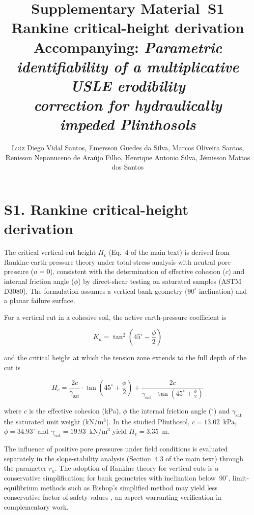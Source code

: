 \documentclass[12pt,a4paper]{article}
\title{\textbf{Supplementary Material~S1}\\[6pt]
Rankine critical-height derivation\\[6pt]
\large Accompanying: \textit{Parametric identifiability of a multiplicative USLE erodibility\\correction for hydraulically impeded Plinthosols}}
\author{Luiz Diego Vidal Santos, Emersson Guedes da Silva, Marcos Oliveira Santos,\\
Renisson Neponuceno de Ara\'{u}jo Filho, Henrique Antonio Silva, J\'{e}misson Mattos dos Santos}
\date{}
\begin{document}
\maketitle

\section*{S1. Rankine critical-height derivation}

The critical vertical-cut height $H_c$ (Eq.~4 of the main text) is derived from Rankine earth-pressure theory under total-stress analysis with neutral pore pressure ($u = 0$), consistent with the determination of effective cohesion ($c$) and internal friction angle ($\phi$) by direct-shear testing on saturated samples (ASTM D3080). The formulation assumes a vertical bank geometry ($90^\circ$ inclination) and a planar failure surface.

For a vertical cut in a cohesive soil, the active earth-pressure coefficient is

\begin{equation}
K_a = \tan^2\!\left(45^\circ - \frac{\phi}{2}\right)
\end{equation}

\noindent and the critical height at which the tension zone extends to the full depth of the cut is

\begin{equation}
H_c = \frac{2c}{\gamma_{\mathrm{sat}}} \cdot \tan\!\left(45^\circ + \frac{\phi}{2}\right) + \frac{2c}{\gamma_{\mathrm{sat}} \cdot \tan\!\left(45^\circ + \frac{\phi}{2}\right)}
\end{equation}

\noindent where $c$ is the effective cohesion (kPa), $\phi$ the internal friction angle ($^\circ$) and $\gamma_{\mathrm{sat}}$ the saturated unit weight (kN/m$^3$). In the studied Plinthosol, $c = 13.02$~kPa, $\phi = 34.93^\circ$ and $\gamma_{\mathrm{sat}} = 19.93$~kN/m$^3$ yield $H_c = 3.35$~m.

The influence of positive pore pressures under field conditions is evaluated separately in the slope-stability analysis (Section~4.3 of the main text) through the parameter $r_u$. The adoption of Rankine theory for vertical cuts is a conservative simplification; for bank geometries with inclination below~$90^\circ$, limit-equilibrium methods such as Bishop's simplified method may yield less conservative factor-of-safety values \citep{fredlund_rahardjo_1993}, an aspect warranting verification in complementary work.



\end{document}
